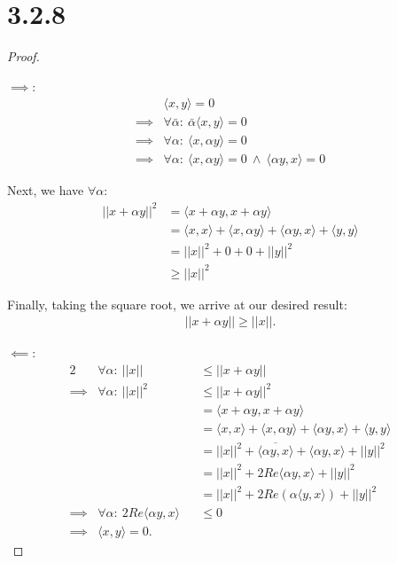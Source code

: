\documentclass{article}
\begin{document}
\section*{3.2.8}
\begin{proof}
  $ $

  \underline{$\implies$}:
  \begin{align*}
    & \langle x, y \rangle = 0 \\
    \implies& \forall \bar{\alpha}: \: \bar{\alpha} \langle x, y \rangle = 0 \\
    \implies& \forall \alpha: \: \langle x, \alpha y \rangle = 0 \\
    \implies& \forall \alpha: \: \langle x, \alpha y \rangle = 0 \: \land \: \langle \alpha y, x \rangle = 0
  \end{align*}

  Next, we have $\forall \alpha$:
  \begin{align*}
    ||x + \alpha y||^2 
    &= \langle x + \alpha y, x + \alpha y \rangle \\
    &= 
    \langle x, x \rangle
    +
    \langle x, \alpha y \rangle
    +
    \langle \alpha y, x \rangle
    +
    \langle y, y \rangle \\
    &= 
    ||x||^2
    +
    0
    +
    0
    +
    ||y||^2 \\
    &\geq ||x||^2
  \end{align*}

  Finally, taking the square root, we arrive at our desired result:
  \begin{align*}
    ||x + \alpha y|| \geq ||x||.
  \end{align*}

  \underline{$\impliedby$}:
  \begin{alignat*}{2}
    & \forall \alpha: \: ||x|| &&\leq ||x + \alpha y||  \\
    \implies& \forall \alpha: \: ||x||^2 &&\leq ||x + \alpha y||^2 \\
    & &&= \langle x + \alpha y, x + \alpha y \rangle \\
    & &&= \langle x, x \rangle
    +
    \langle x, \alpha y \rangle
    +
    \langle \alpha y, x \rangle
    +
    \langle y, y \rangle \\
    & &&= 
    ||x||^2
    +
   \overline{\langle \alpha y, x \rangle}
    +
    \langle \alpha y, x \rangle
    +
    ||y||^2 \\
    & &&= 
    ||x||^2
    +
    2Re\langle \alpha y, x \rangle
    +
    ||y||^2 \\
    & &&= 
    ||x||^2
    +
    2Re (\alpha \langle y, x \rangle)
    +
    ||y||^2 \\
    \implies& \forall \alpha: \: 2Re\langle \alpha y, x \rangle &&\leq 0 \\
    \implies& \langle x, y \rangle = 0.
  \end{alignat*}

\end{proof}
\end{document}
